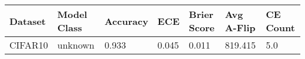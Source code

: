 \begin{tabular}{lllllll}
\toprule
Dataset & Model Class & Accuracy & ECE & Brier Score & Avg A-Flip & CE Count \\
\midrule
CIFAR10 & unknown & 0.933 & 0.045 & 0.011 & 819.415 & 5.0 \\
\bottomrule
\end{tabular}
